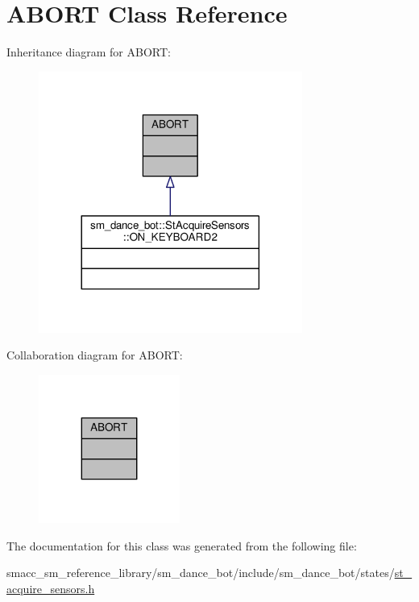 \hypertarget{classABORT}{}\section{A\+B\+O\+RT Class Reference}
\label{classABORT}


Inheritance diagram for A\+B\+O\+RT\+:\nopagebreak
\begin{figure}[H]
\begin{center}
\leavevmode
\includegraphics[width=245pt]{classABORT__inherit__graph}
\end{center}
\end{figure}


Collaboration diagram for A\+B\+O\+RT\+:\nopagebreak
\begin{figure}[H]
\begin{center}
\leavevmode
\includegraphics[width=131pt]{classABORT__coll__graph}
\end{center}
\end{figure}


The documentation for this class was generated from the following file\+:\begin{DoxyCompactItemize}
\item 
smacc\+\_\+sm\+\_\+reference\+\_\+library/sm\+\_\+dance\+\_\+bot/include/sm\+\_\+dance\+\_\+bot/states/\hyperlink{st__acquire__sensors_8h}{st\+\_\+acquire\+\_\+sensors.\+h}\end{DoxyCompactItemize}
